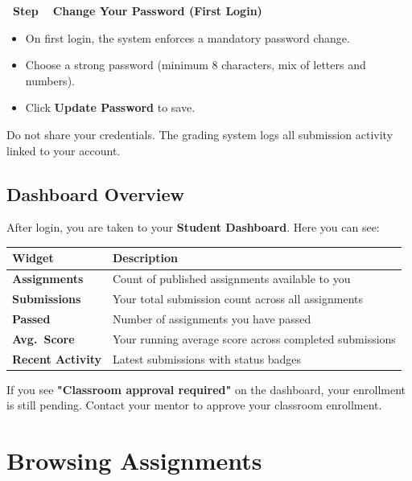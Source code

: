 \documentclass[12pt,a4paper]{article}
\newcounter{stepnum}
\newcommand{\step}[1]{%
  \stepcounter{stepnum}%
  \vspace{6pt}%
  \noindent\colorbox{eyantraBlue}{\color{white}\bfseries\small\ Step \thestepnum\ }%
  \hspace{4pt}\textbf{#1}\\[4pt]%
}
\begin{document}
\step{Change Your Password (First Login)}
\begin{itemize}
  \item On first login, the system enforces a mandatory password change.
  \item Choose a strong password (minimum 8 characters, mix of letters and numbers).
  \item Click \textbf{Update Password} to save.
\end{itemize}

\begin{dangerbox}[Security]
  Do not share your credentials. The grading system logs all submission activity linked to your account.
\end{dangerbox}

\subsection{Dashboard Overview}

After login, you are taken to your \textbf{Student Dashboard}. Here you can see:

\begin{center}
\begin{tabularx}{0.95\linewidth}{>{\bfseries}lX}
\toprule
Widget & Description \\
\midrule
Assignments & Count of published assignments available to you \\
Submissions & Your total submission count across all assignments \\
Passed      & Number of assignments you have passed \\
Avg.\ Score & Your running average score across completed submissions \\
Recent Activity & Latest submissions with status badges \\
\bottomrule
\end{tabularx}
\end{center}

\begin{infobox}
  If you see \textbf{"Classroom approval required"} on the dashboard, your enrollment is still pending. Contact your mentor to approve your classroom enrollment.
\end{infobox}

\section{Browsing Assignments}
\end{document}
